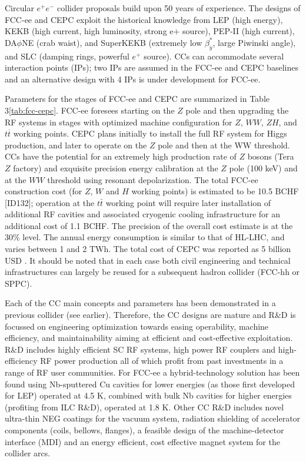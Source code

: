 Circular $e^+e^-$ collider proposals build upon 50 years of experience. The designs of FCC-ee and CEPC exploit the historical knowledge from LEP (high energy), KEKB (high current, high luminosity, strong e+ source), PEP-II (high current), DA$\phi$NE (crab waist), and SuperKEKB (extremely low $\beta_{y}^{\ast}$, large Piwinski angle), and SLC (damping rings, powerful $e^+$  source). CCs can accommodate several interaction points (IPs); two IPs are assumed in the FCC-ee and CEPC baselines and an alternative design with 4 IPs is under development for FCC-ee.

Parameters for the stages of FCC-ee and CEPC are summarized in Table 3\ref{tab:fcc-cepc}. 
FCC-ee foresees starting on the $Z$ pole and then upgrading the RF systems in stages with optimized machine configuration for $Z$, $WW$, $ZH$, and $t\overline{t}$ working points. CEPC plans initially to install the full RF system for Higgs production, and later to operate on the $Z$ pole and then at the WW threshold. CCs have the potential for an extremely high production rate of $Z$ bosons (Tera $Z$ factory) and exquisite precision energy calibration at the $Z$ pole (100 keV) and at the $WW$ threshold using resonant depolarization.
The total FCC-ee construction cost (for $Z$, $W$ and $H$ working points) is estimated to be 10.5 BCHF [ID132]; operation at the $t\bar{t}$ working point will require later installation of additional RF cavities and associated cryogenic cooling infrastructure for an additional cost of 1.1 BCHF. The precision of the overall cost estimate is at the 30\% level. The annual energy consumption is similar to that of HL-LHC, and varies between 1 and 2 TWh. The total cost of CEPC was reported as 5 billion USD \cite{wang,cepc}. It should be noted that in each case both civil engineering and technical infrastructures can largely be reused for a subsequent hadron collider (FCC-hh or SPPC).

Each of the CC main concepts and parameters has been demonstrated in a previous collider (see earlier). Therefore, the CC designs are mature and R\&D is focussed on engineering optimization towards easing operability, machine efficiency, and maintainability aiming at efficient and cost-effective exploitation. R\&D includes highly efficient SC RF systems, high power RF couplers and high-efficiency RF power production all of which profit from past investments in a range of RF user communities. For FCC-ee a hybrid-technology solution has been found using Nb-sputtered Cu cavities for lower energies (as those first developed for LEP) operated at 4.5 K, combined with bulk Nb cavities for higher energies (profiting from ILC R\&D), operated at 1.8 K.  Other CC R\&D includes novel ultra-thin NEG coatings for the vacuum system, radiation shielding of accelerator components (coils, bellows, flanges), a feasible design of the machine-detector interface (MDI) and an energy efficient, cost effective magnet system for the collider arcs.

